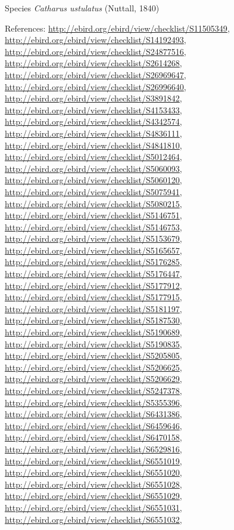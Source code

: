 \documentclass[9pt, article]{memoir}
\begin{document}
\begin{multicols}{2}
\vspace{6pt}\noindent\hspace{36pt}Species \textit{Catharus ustulatus} (Nuttall, 1840)


\vspace{6pt}References: 
\url{http://ebird.org/ebird/view/checklist/S11505349}, 
\url{http://ebird.org/ebird/view/checklist/S14192493}, 
\url{http://ebird.org/ebird/view/checklist/S24877516}, 
\url{http://ebird.org/ebird/view/checklist/S2614268}, 
\url{http://ebird.org/ebird/view/checklist/S26969647}, 
\url{http://ebird.org/ebird/view/checklist/S26996640}, 
\url{http://ebird.org/ebird/view/checklist/S3891842}, 
\url{http://ebird.org/ebird/view/checklist/S4153433}, 
\url{http://ebird.org/ebird/view/checklist/S4342574}, 
\url{http://ebird.org/ebird/view/checklist/S4836111}, 
\url{http://ebird.org/ebird/view/checklist/S4841810}, 
\url{http://ebird.org/ebird/view/checklist/S5012464}, 
\url{http://ebird.org/ebird/view/checklist/S5060093}, 
\url{http://ebird.org/ebird/view/checklist/S5060120}, 
\url{http://ebird.org/ebird/view/checklist/S5075941}, 
\url{http://ebird.org/ebird/view/checklist/S5080215}, 
\url{http://ebird.org/ebird/view/checklist/S5146751}, 
\url{http://ebird.org/ebird/view/checklist/S5146753}, 
\url{http://ebird.org/ebird/view/checklist/S5153679}, 
\url{http://ebird.org/ebird/view/checklist/S5165657}, 
\url{http://ebird.org/ebird/view/checklist/S5176285}, 
\url{http://ebird.org/ebird/view/checklist/S5176447}, 
\url{http://ebird.org/ebird/view/checklist/S5177912}, 
\url{http://ebird.org/ebird/view/checklist/S5177915}, 
\url{http://ebird.org/ebird/view/checklist/S5181197}, 
\url{http://ebird.org/ebird/view/checklist/S5187530}, 
\url{http://ebird.org/ebird/view/checklist/S5190689}, 
\url{http://ebird.org/ebird/view/checklist/S5190835}, 
\url{http://ebird.org/ebird/view/checklist/S5205805}, 
\url{http://ebird.org/ebird/view/checklist/S5206625}, 
\url{http://ebird.org/ebird/view/checklist/S5206629}, 
\url{http://ebird.org/ebird/view/checklist/S5247378}, 
\url{http://ebird.org/ebird/view/checklist/S5355396}, 
\url{http://ebird.org/ebird/view/checklist/S6431386}, 
\url{http://ebird.org/ebird/view/checklist/S6459646}, 
\url{http://ebird.org/ebird/view/checklist/S6470158}, 
\url{http://ebird.org/ebird/view/checklist/S6529816}, 
\url{http://ebird.org/ebird/view/checklist/S6551019}, 
\url{http://ebird.org/ebird/view/checklist/S6551020}, 
\url{http://ebird.org/ebird/view/checklist/S6551028}, 
\url{http://ebird.org/ebird/view/checklist/S6551029}, 
\url{http://ebird.org/ebird/view/checklist/S6551031}, 
\url{http://ebird.org/ebird/view/checklist/S6551032}, 

\end{multicols}
\end{document}
